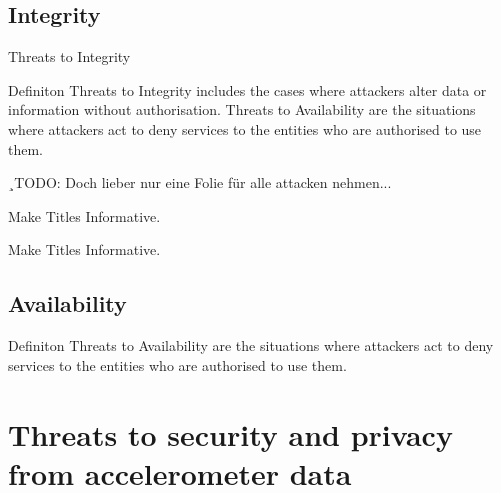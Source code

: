 \documentclass[ucs,9pt]{beamer}
\begin{document}
\subsection{Integrity}


\begin{frame}{Threats to Integrity}
		\begin{alertblock}{Definiton}
			Threats to Integrity includes the cases  where attackers alter data or information without authorisation.  Threats to Availability are the situations where attackers act  to deny services to the entities who are authorised to use them.
		\end{alertblock}
	
\end{frame}

¸TODO: Doch lieber nur eine Folie für alle attacken nehmen...

\begin{frame}{Make Titles Informative.}
\end{frame}

\begin{frame}{Make Titles Informative.}
\end{frame}



\subsection{Availability}

\begin{frame}

\begin{alertblock}{Definiton}
 Threats to Availability are the situations where attackers act  to deny services to the entities who are authorised to use them.
\end{alertblock}
\end{frame}

\section{Threats to security and privacy from accelerometer data}
\end{document}
